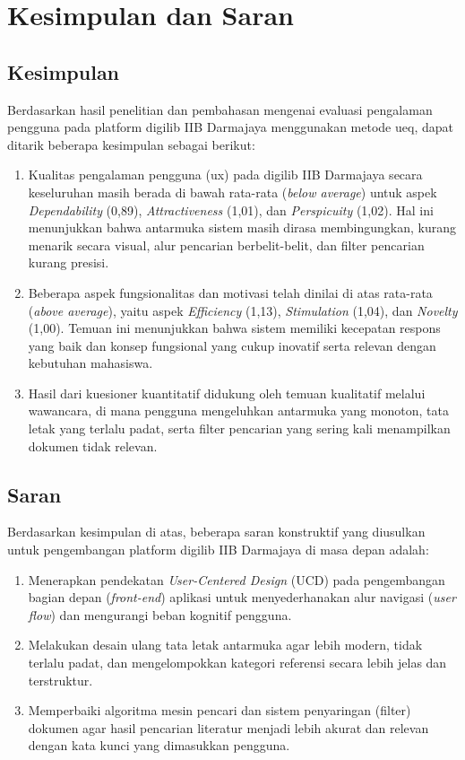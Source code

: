 \chapter{Kesimpulan dan Saran}\label{cha:conclusion}

\section{Kesimpulan}
Berdasarkan hasil penelitian dan pembahasan mengenai evaluasi pengalaman pengguna pada platform \gls{digilib} IIB Darmajaya menggunakan metode \gls{ueq}, dapat ditarik beberapa kesimpulan sebagai berikut:
\begin{enumerate}
    \item Kualitas pengalaman pengguna (\gls{ux}) pada \gls{digilib} IIB Darmajaya secara keseluruhan masih berada di bawah rata-rata (\textit{below average}) untuk aspek \textit{Dependability} (0,89), \textit{Attractiveness} (1,01), dan \textit{Perspicuity} (1,02). Hal ini menunjukkan bahwa antarmuka sistem masih dirasa membingungkan, kurang menarik secara visual, alur pencarian berbelit-belit, dan filter pencarian kurang presisi.
    \item Beberapa aspek fungsionalitas dan motivasi telah dinilai di atas rata-rata (\textit{above average}), yaitu aspek \textit{Efficiency} (1,13), \textit{Stimulation} (1,04), dan \textit{Novelty} (1,00). Temuan ini menunjukkan bahwa sistem memiliki kecepatan respons yang baik dan konsep fungsional yang cukup inovatif serta relevan dengan kebutuhan mahasiswa.
    \item Hasil dari kuesioner kuantitatif didukung oleh temuan kualitatif melalui wawancara, di mana pengguna mengeluhkan antarmuka yang monoton, tata letak yang terlalu padat, serta filter pencarian yang sering kali menampilkan dokumen tidak relevan.
\end{enumerate}

\section{Saran}
Berdasarkan kesimpulan di atas, beberapa saran konstruktif yang diusulkan untuk pengembangan platform \gls{digilib} IIB Darmajaya di masa depan adalah:
\begin{enumerate}
    \item Menerapkan pendekatan \textit{User-Centered Design} (UCD) pada pengembangan bagian depan (\textit{front-end}) aplikasi untuk menyederhanakan alur navigasi (\textit{user flow}) dan mengurangi beban kognitif pengguna.
    \item Melakukan desain ulang tata letak antarmuka agar lebih modern, tidak terlalu padat, dan mengelompokkan kategori referensi secara lebih jelas dan terstruktur.
    \item Memperbaiki algoritma mesin pencari dan sistem penyaringan (filter) dokumen agar hasil pencarian literatur menjadi lebih akurat dan relevan dengan kata kunci yang dimasukkan pengguna.
\end{enumerate}